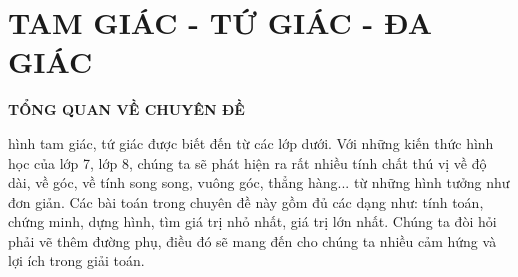 \section{TAM GIÁC - TỨ GIÁC - ĐA GIÁC}

\begin{center}
 \large \textbf{TỔNG QUAN VỀ CHUYÊN ĐỀ}
\end{center}
 hình tam giác, tứ giác được biết đến từ các lớp dưới. Với những kiến thức hình học của lớp 7, lớp 8, chúng ta sẽ phát hiện ra rất nhiều tính chất thú vị về độ dài, về góc, về tính song song, vuông góc, thẳng hàng... từ những hình tưởng như đơn giản.
Các bài toán trong chuyên đề này gồm đủ các dạng như: tính toán, chứng minh, dựng hình, tìm giá trị nhỏ nhất, giá trị lớn nhất. Chúng ta đòi hỏi phải vẽ thêm đường phụ, điều đó sẽ mang đến cho chúng ta nhiều cảm hứng và lợi ích trong giải toán.
